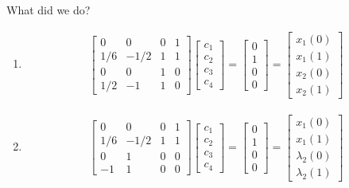 \noindent
What did we do?
\begin{enumerate}[label=Case \arabic*:,itemindent=1cm]
\item \mbox{}
  \begin{gather}
    \begin{bmatrix}
      0 & 0 & 0 & 1 \\
      1/6 & -1/2 & 1 & 1 \\
      0 & 0 & 1 & 0 \\
      1/2 & -1 & 1 & 0
    \end{bmatrix}
    \begin{bmatrix}
      c_1 \\ c_2 \\ c_3 \\ c_4
    \end{bmatrix}
    =
    \begin{bmatrix}
      0 \\ 1 \\ 0 \\ 0
    \end{bmatrix}
    =
    \begin{bmatrix}
      x_1(0) \\ x_1(1) \\ x_2(0) \\ x_2(1)
    \end{bmatrix}
  \end{gather}
\item \mbox{}
  \begin{gather}
    \begin{bmatrix}
      0 & 0 & 0 & 1 \\
      1/6 & -1/2 & 1 & 1 \\
      0 & 1 & 0 & 0 \\
      -1 & 1 & 0 & 0
    \end{bmatrix}
    \begin{bmatrix}
      c_1 \\ c_2 \\ c_3 \\ c_4
    \end{bmatrix}
    =
    \begin{bmatrix}
      0 \\ 1 \\ 0 \\ 0
    \end{bmatrix}
    =
    \begin{bmatrix}
      x_1(0) \\ x_1(1) \\ \lambda_2(0) \\ \lambda_2(1)
    \end{bmatrix}
  \end{gather}
\end{enumerate}

